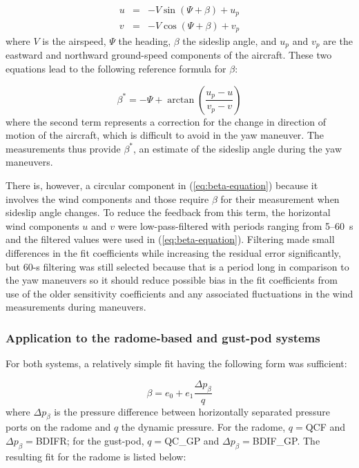 \documentclass[12pt,twoside,english]{article}\usepackage[]{graphicx}\usepackage[]{color}
\begin{document}
{{\begin{eqnarray}
u & = & -V\sin(\Psi+\beta)+u_{p}\nonumber \\ v & = & -V\cos(\Psi+\beta)+v_{p}\label{eq:horizWindeqs} 
\end{eqnarray}
where $V$ is the airspeed, $\Psi$ the heading, $\beta$ the sideslip angle, and $u_{p}$ and $v_{p}$ are the eastward and northward ground-speed components of the aircraft. These two equations lead to the following reference formula for $\beta$: 

\begin{equation}
\beta^{*}=-\Psi+\arctan\left(\frac{u_{p}-u}{v_{p}-v}\right)\label{eq:beta-equation} 
\end{equation}
where the second term represents a correction for the change in direction of motion of the aircraft, which is difficult to avoid in the yaw maneuver. The measurements thus provide $\beta^{*}$, an estimate of the sideslip angle during the yaw maneuvers. 

There is, however, a circular component in (\ref{eq:beta-equation}) because it involves the wind components and those require $\beta$ for their measurement when sideslip angle changes. To reduce the feedback from this term, the horizontal wind components $u$ and $v$ were low-pass-filtered with periods ranging from 5--60~s and the filtered values were used in (\ref{eq:beta-equation}). Filtering made small differences in the fit coefficients while increasing the residual error significantly, but 60-s filtering was still selected because that is a period long in comparison to the yaw maneuvers so it should reduce possible bias in the fit coefficients from use of the older sensitivity coefficients and any associated fluctuations in the wind measurements during maneuvers. 


\subsubsection{Application to the radome-based and gust-pod systems\label{sub:radome-and-gust-pod-beta}}

For both systems, a relatively simple fit having the following form was sufficient: 

\begin{equation}
\beta=e_{0}+e_{1}\frac{\Delta p_{\beta}}{q}\label{eq:betaFunctionForm} 
\end{equation}
where $\Delta p_{\beta}$ is the pressure difference between horizontally separated pressure ports on the radome and $q$ the dynamic pressure. For the radome, $q=$QCF and $\Delta p_{\beta}=$BDIFR; for the gust-pod, $q=$QC\_GP and $\Delta p_{\beta}=$BDIF\_GP. The resulting fit for the radome is listed below: 

}}
\end{document}
